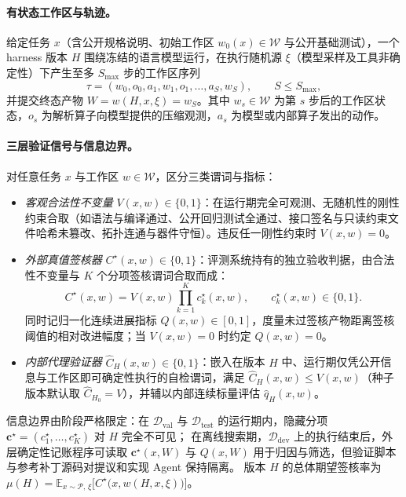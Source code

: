 \documentclass[UTF8,a4paper,10.5pt]{ctexart}
\newcommand{\Ddev}{\mathcal{D}_{\mathrm{dev}}}
\newcommand{\Dval}{\mathcal{D}_{\mathrm{val}}}
\newcommand{\Dtest}{\mathcal{D}_{\mathrm{test}}}
\newcommand{\E}{\mathbb{E}}
\begin{document}
\paragraph{有状态工作区与轨迹。}
给定任务 $x$（含公开规格说明、初始工作区 $w_0(x)\in\mathcal{W}$ 与公开基础测试），一个 harness 版本 $H$ 围绕冻结的语言模型运行，在执行随机源 $\xi$（模型采样及工具非确定性）下产生至多 $S_{\max}$ 步的工作区序列
\begin{equation}
  \tau = (w_0, o_0, a_1, w_1, o_1, \dots, a_S, w_S), \qquad S \le S_{\max},
\end{equation}
并提交终态产物 $W = w(H, x, \xi) = w_S$。其中 $w_s\in\mathcal{W}$ 为第 $s$ 步后的工作区状态，$o_s$ 为解析算子向模型提供的压缩观测，$a_s$ 为模型或内部算子发出的动作。

\paragraph{三层验证信号与信息边界。}
对任意任务 $x$ 与工作区 $w\in\mathcal{W}$，区分三类谓词与指标：
\begin{itemize}
  \item \emph{客观合法性不变量} $V(x, w)\in\{0,1\}$：在运行期完全可观测、无随机性的刚性约束合取（如语法与编译通过、公开回归测试全通过、接口签名与只读约束文件哈希未篡改、拓扑连通与器件守恒）。违反任一刚性约束时 $V(x,w)=0$。
  \item \emph{外部真值签核器} $C^\star(x, w)\in\{0,1\}$：评测系统持有的独立验收判据，由合法性不变量与 $K$ 个分项签核谓词合取而成：
  \begin{equation}
    C^\star(x, w) = V(x, w)\prod_{k=1}^{K} c^\star_k(x, w), \qquad c^\star_k(x, w)\in\{0,1\}.
  \end{equation}
  同时记归一化连续进展指标 $Q(x, w)\in[0,1]$，度量未过签核产物距离签核阈值的相对改进幅度；当 $V(x,w)=0$ 时约定 $Q(x,w)=0$。
  \item \emph{内部代理验证器} $\hat{C}_H(x, w)\in\{0,1\}$：嵌入在版本 $H$ 中、运行期仅凭公开信息与工作区即可确定性执行的自检谓词，满足 $\hat{C}_H(x,w)\le V(x,w)$（种子版本默认取 $\hat{C}_{H_0}=V$），并辅以内部连续标量评估 $\hat{q}_H(x, w)$。
\end{itemize}
信息边界由阶段严格限定：在 $\Dval$ 与 $\Dtest$ 的运行期内，隐藏分项 $\mathbf{c}^\star=(c^\star_1,\dots,c^\star_K)$ 对 $H$ 完全不可见；
在离线搜索期，$\Ddev$ 上的执行结束后，外层确定性记账程序可读取 $\mathbf{c}^\star(x, W)$ 与 $Q(x, W)$ 用于归因与筛选，但验证脚本与参考补丁源码对提议和实现 Agent 保持隔离。
版本 $H$ 的总体期望签核率为 $\mu(H)=\E_{x\sim\mathcal{P},\,\xi}\bigl[C^\star\bigl(x, w(H,x,\xi)\bigr)\bigr]$。
\end{document}

